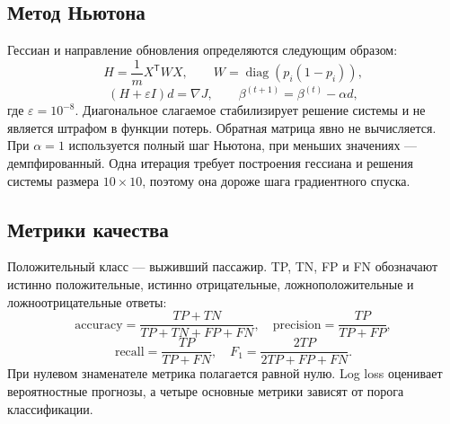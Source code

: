 \subsection{Метод Ньютона}
Гессиан и направление обновления определяются следующим образом:
\[
H=\frac{1}{m}X^\mathsf{T}WX,\qquad W=\operatorname{diag}(p_i(1-p_i)),
\]
\[
(H+\varepsilon I)d=\nabla J,\qquad
\beta^{(t+1)}=\beta^{(t)}-\alpha d,
\]
где $\varepsilon=10^{-8}$. Диагональное слагаемое стабилизирует решение системы и не является штрафом в функции потерь. Обратная матрица явно не вычисляется. При $\alpha=1$ используется полный шаг Ньютона, при меньших значениях — демпфированный. Одна итерация требует построения гессиана и решения системы размера $10\times10$, поэтому она дороже шага градиентного спуска.

\subsection{Метрики качества}
Положительный класс — выживший пассажир. TP, TN, FP и FN обозначают истинно положительные, истинно отрицательные, ложноположительные и ложноотрицательные ответы:
\[
\mathrm{accuracy}=\frac{TP+TN}{TP+TN+FP+FN},\quad
\mathrm{precision}=\frac{TP}{TP+FP},
\]
\[
\mathrm{recall}=\frac{TP}{TP+FN},\quad
F_1=\frac{2TP}{2TP+FP+FN}.
\]
При нулевом знаменателе метрика полагается равной нулю. Log loss оценивает вероятностные прогнозы, а четыре основные метрики зависят от порога классификации.


\newpage
